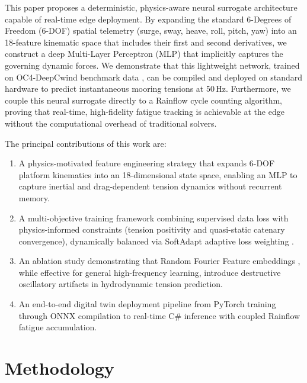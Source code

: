 \documentclass[preprint,12pt]{elsarticle}
\begin{document}
This paper proposes a deterministic, physics-aware neural surrogate architecture capable of real-time edge deployment. By expanding the standard 6-Degrees of Freedom (6-DOF) spatial telemetry (surge, sway, heave, roll, pitch, yaw) into an 18-feature kinematic space that includes their first and second derivatives, we construct a deep Multi-Layer Perceptron (MLP) that implicitly captures the governing dynamic forces. We demonstrate that this lightweight network, trained on OC4-DeepCwind benchmark data \cite{robertson2014oc4}, can be compiled and deployed on standard hardware to predict instantaneous mooring tensions at 50\,Hz. Furthermore, we couple this neural surrogate directly to a Rainflow cycle counting algorithm, proving that real-time, high-fidelity fatigue tracking is achievable at the edge without the computational overhead of traditional solvers.

The principal contributions of this work are:
\begin{enumerate}
    \item A physics-motivated feature engineering strategy that expands 6-DOF platform kinematics into an 18-dimensional state space, enabling an MLP to capture inertial and drag-dependent tension dynamics without recurrent memory.
    \item A multi-objective training framework combining supervised data loss with physics-informed constraints (tension positivity and quasi-static catenary convergence), dynamically balanced via SoftAdapt adaptive loss weighting \cite{heiss2019softadapt}.
    \item An ablation study demonstrating that Random Fourier Feature embeddings \cite{tancik2020fourier}, while effective for general high-frequency learning, introduce destructive oscillatory artifacts in hydrodynamic tension prediction.
    \item An end-to-end digital twin deployment pipeline from PyTorch training through ONNX compilation to real-time C\# inference with coupled Rainflow fatigue accumulation.
\end{enumerate}

\section{Methodology}
\label{sec:methodology}
\end{document}
